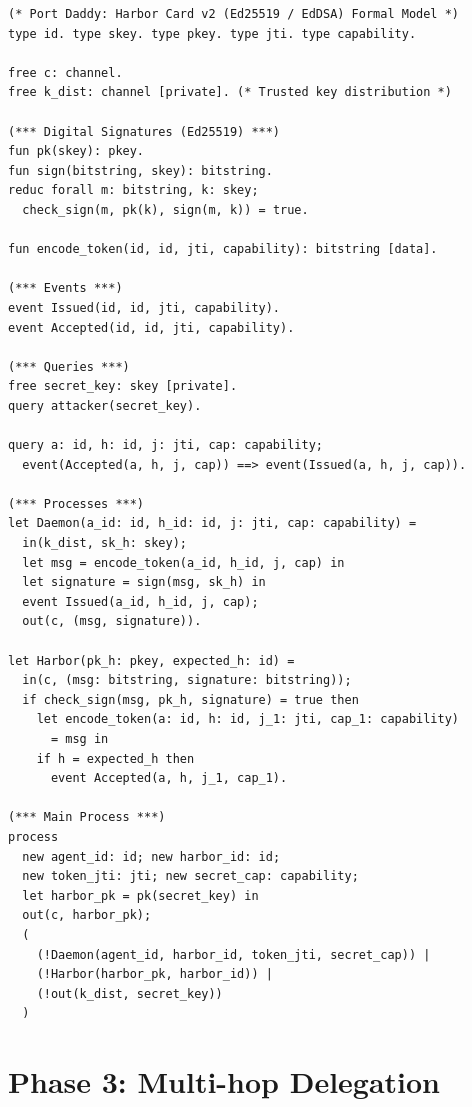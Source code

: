 \documentclass[11pt,a4paper]{article}
\theoremstyle{definition}
\begin{document}
\begin{lstlisting}[caption={\texttt{harbor\_card\_v2\_asymmetric.pv} --- Verified in ProVerif 2.05}]
(* Port Daddy: Harbor Card v2 (Ed25519 / EdDSA) Formal Model *)
type id. type skey. type pkey. type jti. type capability.

free c: channel.
free k_dist: channel [private]. (* Trusted key distribution *)

(*** Digital Signatures (Ed25519) ***)
fun pk(skey): pkey.
fun sign(bitstring, skey): bitstring.
reduc forall m: bitstring, k: skey;
  check_sign(m, pk(k), sign(m, k)) = true.

fun encode_token(id, id, jti, capability): bitstring [data].

(*** Events ***)
event Issued(id, id, jti, capability).
event Accepted(id, id, jti, capability).

(*** Queries ***)
free secret_key: skey [private].
query attacker(secret_key).

query a: id, h: id, j: jti, cap: capability;
  event(Accepted(a, h, j, cap)) ==> event(Issued(a, h, j, cap)).

(*** Processes ***)
let Daemon(a_id: id, h_id: id, j: jti, cap: capability) =
  in(k_dist, sk_h: skey);
  let msg = encode_token(a_id, h_id, j, cap) in
  let signature = sign(msg, sk_h) in
  event Issued(a_id, h_id, j, cap);
  out(c, (msg, signature)).

let Harbor(pk_h: pkey, expected_h: id) =
  in(c, (msg: bitstring, signature: bitstring));
  if check_sign(msg, pk_h, signature) = true then
    let encode_token(a: id, h: id, j_1: jti, cap_1: capability)
      = msg in
    if h = expected_h then
      event Accepted(a, h, j_1, cap_1).

(*** Main Process ***)
process
  new agent_id: id; new harbor_id: id;
  new token_jti: jti; new secret_cap: capability;
  let harbor_pk = pk(secret_key) in
  out(c, harbor_pk);
  (
    (!Daemon(agent_id, harbor_id, token_jti, secret_cap)) |
    (!Harbor(harbor_pk, harbor_id)) |
    (!out(k_dist, secret_key))
  )
\end{lstlisting}

\section{Phase 3: Multi-hop Delegation}\label{app:phase3}
\end{document}
